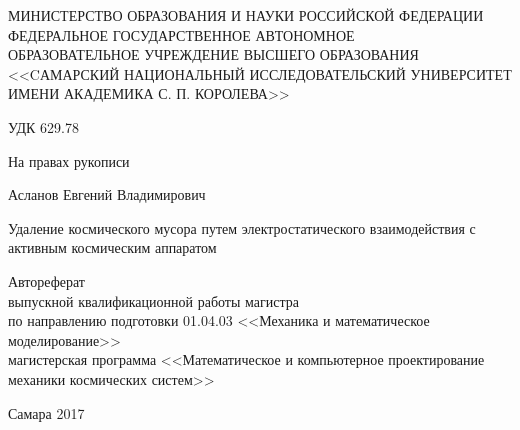\begin{titlepage}

\begin{center}
\vspace{1.5em}
\small{МИНИСТЕРСТВО ОБРАЗОВАНИЯ И НАУКИ РОССИЙСКОЙ ФЕДЕРАЦИИ\\
\vspace{\baselineskip}
ФЕДЕРАЛЬНОЕ ГОСУДАРСТВЕННОЕ АВТОНОМНОЕ\\
ОБРАЗОВАТЕЛЬНОЕ УЧРЕЖДЕНИЕ ВЫСШЕГО ОБРАЗОВАНИЯ\\
<<CАМАРСКИЙ НАЦИОНАЛЬНЫЙ ИССЛЕДОВАТЕЛЬСКИЙ УНИВЕРСИТЕТ\\
ИМЕНИ АКАДЕМИКА С. П. КОРОЛЕВА>>\\}
\vspace{\baselineskip}
\end{center}

\begin{minipage}{.45\linewidth}
	\begin{flushleft}                           
	\small{УДК 629.78}
	\end{flushleft} 
\end{minipage}
\hfill
\begin{minipage}{.45\linewidth}
	\begin{flushright}                
	\small{На правах рукописи}
	\end{flushright} 
\end{minipage}

\vspace{3em}

\begin{center}
	Асланов Евгений Владимирович
\end{center}

\begin{center}
Удаление космического мусора путем электростатического взаимодействия с активным космическим аппаратом
\end{center}

\vspace{3em}

\begin{center}
\small{Автореферат\\
выпускной квалификационной работы магистра\\
по направлению подготовки 01.04.03 <<Механика и математическое моделирование>>\\
магистерская программа <<Математическое и компьютерное проектирование механики космических систем>>}
\end{center}

\vspace{\fill}

\begin{center}
Самара 2017
\end{center}
\end{titlepage}
\newpage

